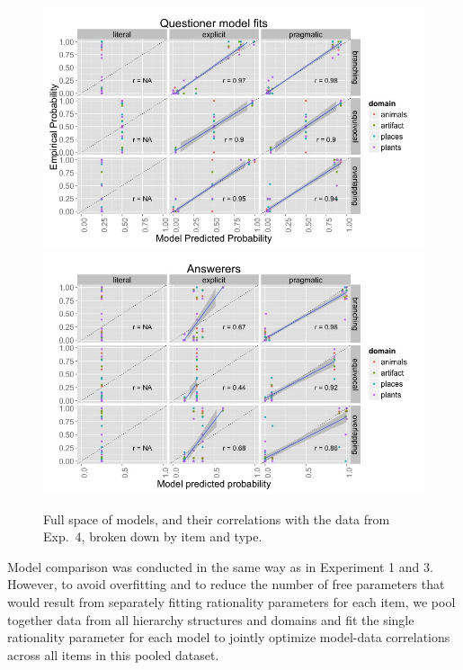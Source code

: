 \documentclass[12pt, floatsintext, man]{apa6}
\begin{document}
%
\begin{figure}[t!]
\begin{center}
\includegraphics[scale=.55]{Exp4QuestFits.jpeg}
\includegraphics[scale=.55]{Exp4AnsFits.jpeg}
\end{center}
\vspace{-.5cm}
\caption{Full space of models, and their correlations with the data from Exp.~4, broken down by item and type.}
\label{fig:Exp4ModelSpace}
\vspace{-.15cm}
\end{figure}
%

Model comparison was conducted in the same way as in Experiment 1 and 3. However, to avoid overfitting and to reduce the number of free parameters that would result from separately fitting rationality parameters for each item, we pool together data from all hierarchy structures and domains and fit the single rationality parameter for each model to jointly optimize model-data correlations across all items in this pooled dataset. 
\end{document}
